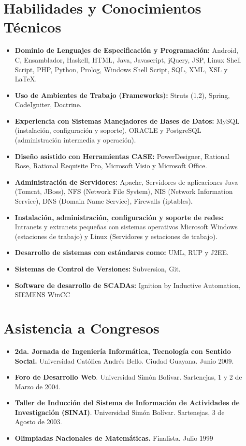 \documentclass[letterpaper,11pt]{report}
\begin{document}
\section*{Habilidades y Conocimientos Técnicos}
\begin{itemize}
\item \textbf{Dominio de Lenguajes de Especificación y Programación:} Android, C, Ensamblador, Haskell, HTML, Java, Javascript, jQuery, JSP, Linux Shell Script, PHP, Python, Prolog, Windows Shell Script, SQL, XML, XSL y LaTeX.
\item \textbf{Uso de Ambientes de Trabajo (Frameworks):} Struts (1,2), Spring, CodeIgniter, Doctrine.
\item \textbf{Experiencia con Sistemas Manejadores de Bases de Datos:} MySQL (instalación, configuración y soporte), ORACLE y PostgreSQL (administración intermedia y operación).
\item \textbf{Dise\~{n}o asistido con Herramientas CASE:} PowerDesigner, Rational Rose, Rational Requisite Pro, Microsoft Visio y Microsoft Office.
\item \textbf{Administración de Servidores:} Apache, Servidores de aplicaciones Java (Tomcat, JBoss), NFS (Network File System), NIS (Network Information Service), DNS (Domain Name Service), Firewalls (iptables).
\item \textbf{Instalación, administración, configuración y soporte de redes:} Intranets y extranets peque\~{n}as con sistemas operativos Microsoft Windows (estaciones de trabajo) y Linux (Servidores y estaciones de trabajo).
\item \textbf{Desarrollo de sistemas con estándares como:} UML, RUP y J2EE.
\item \textbf{Sistemas de Control de Versiones:} Subversion, Git.
\item \textbf{Software de desarrollo de SCADAs:} Ignition by Inductive Automation, SIEMENS WinCC
\end{itemize}

\section*{Asistencia a Congresos}
\begin{itemize}
\item
\textbf{2da. Jornada de Ingeniería Informática, Tecnología con Sentido Social.} Universidad Católica Andrés Bello. Ciudad Guayana. Junio 2009.
\item
\textbf{Foro de Desarrollo Web}. Universidad Simón Bolívar. Sartenejas, 1 y 2 de Marzo de 2004.
\item
\textbf{Taller de Inducción del Sistema de Información de Actividades de Investigación (SINAI)}. Universidad Simón Bolívar. Sartenejas, 3 de Agosto de 2003.
\item
\textbf{Olimpiadas Nacionales de Matemáticas.} Finalista. Julio 1999
\end{itemize}
\end{document}
